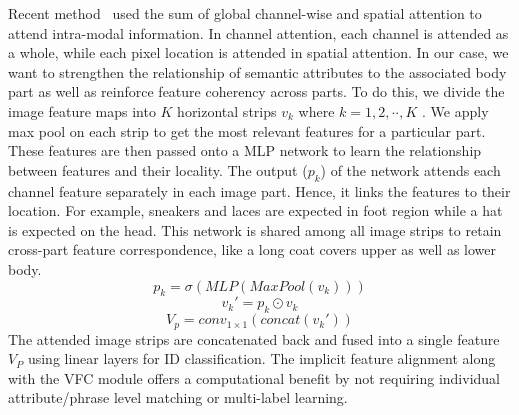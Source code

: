 \documentclass[letterpaper]{article} \usepackage{aaai22}  \usepackage{times}  \usepackage{helvet}  \usepackage{courier}  \usepackage[hyphens]{url}  \usepackage{graphicx} \urlstyle{rm} \def\UrlFont{\rm}  \usepackage{natbib}  \usepackage{caption} \DeclareCaptionStyle{ruled}{labelfont=normalfont,labelsep=colon,strut=off} \frenchspacing  \setlength{\pdfpagewidth}{8.5in}  \setlength{\pdfpageheight}{11in}  \usepackage{algorithm}
\begin{document}
Recent method~\cite{wang2020img} used the sum of global channel-wise and spatial attention to attend intra-modal information. In channel attention, each channel is attended as a whole, while each pixel location is attended in spatial attention. In our case, we want to strengthen the relationship of semantic attributes to the associated body part as well as reinforce feature coherency across parts. To do this, we divide the image feature maps into $K$ horizontal strips $v_k$ where $k=1,2,\cdot\cdot, K$ . We apply max pool on each strip to get the most relevant features for a particular part. These features are then passed onto a MLP network to learn the relationship between features and their locality. The output ($p_k$) of the network attends each channel feature separately in each image part. Hence, it links the features to their location. For example, sneakers and laces are expected in foot region while a hat is expected on the head. This network is shared among all image strips to retain cross-part feature correspondence, like a long coat covers upper as well as lower body.
\begin{equation}
    {{p_k}} = \sigma(MLP(MaxPool({v_k})))
\end{equation}
\begin{equation}
    {{v_k}'} = p_{k} \odot v_{k}
\end{equation}
\begin{equation}
    {V_p} = conv_{1\times1}(concat({{v_k}}'))
\end{equation}
The attended image strips are concatenated back and fused into a single feature $V_{P}$ using linear layers for ID classification. The implicit feature alignment along with the VFC module offers a computational benefit by not requiring individual attribute/phrase level matching or multi-label learning.
\end{document}
